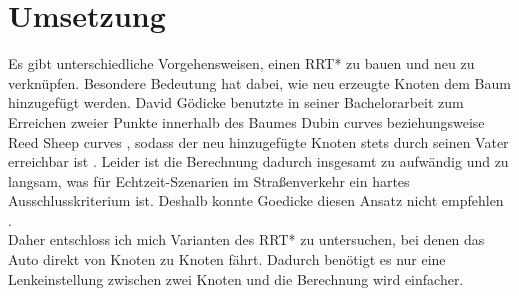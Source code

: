 \section{Umsetzung}
\label{sec:Umsetzung}
Es gibt unterschiedliche Vorgehensweisen, einen RRT* zu bauen und neu zu verknüpfen. Besondere Bedeutung hat dabei, wie neu erzeugte Knoten dem Baum hinzugefügt werden. David Gödicke benutzte in seiner Bachelorarbeit zum Erreichen zweier Punkte innerhalb des Baumes Dubin curves \citep{Dubin61} beziehungsweise Reed Sheep curves \citep{reeds1990optimal}, sodass der neu hinzugefügte Knoten stets durch seinen Vater erreichbar ist \citep{Goedicke18}. Leider ist die Berechnung dadurch insgesamt zu aufwändig und zu langsam, was für Echtzeit-Szenarien im Straßenverkehr ein hartes Ausschlusskriterium ist. Deshalb konnte Goedicke diesen Ansatz nicht empfehlen \citep[vergleiche][Kapitel 7]{Goedicke18}. \\
Daher entschloss ich mich Varianten des RRT* zu untersuchen, bei denen das Auto direkt von Knoten zu Knoten fährt. Dadurch benötigt es nur eine Lenkeinstellung zwischen zwei Knoten und die Berechnung wird einfacher.\\

